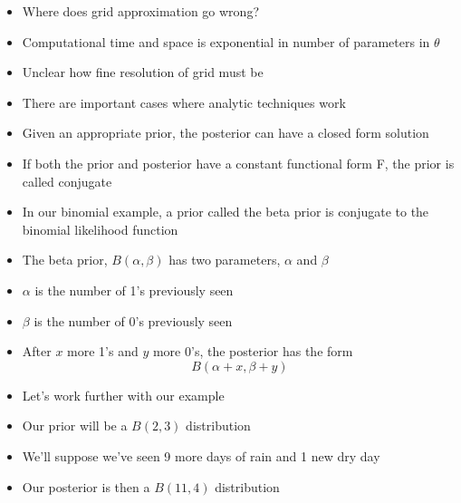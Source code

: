 \documentclass{beamer}
\begin{document}
\frame
{
  \begin{itemize}
    \item{Where does grid approximation go wrong?}
    \item{Computational time and space is exponential in number of parameters in $\theta$}
    \item{Unclear how fine resolution of grid must be}
  \end{itemize}
}

\frame
{
  \begin{itemize}
    \item{There are important cases where analytic techniques work}
    \item{Given an appropriate prior, the posterior can have a closed form solution}
    \item{If both the prior and posterior have a constant functional form F, the prior is called conjugate}
  \end{itemize}
}

\frame
{
  \begin{itemize}
    \item{In our binomial example, a prior called the beta prior is conjugate to the binomial likelihood function}
    \item{The beta prior, $B(\alpha, \beta)$ has two parameters, $\alpha$ and $\beta$}
    \item{$\alpha$ is the number of 1's previously seen}
    \item{$\beta$ is the number of 0's previously seen}
    \item{After $x$ more 1's and $y$ more 0's, the posterior has the form}
    \[
      B(\alpha + x, \beta + y)
    \]
  \end{itemize}
}

\frame
{
  \begin{itemize}
    \item{Let's work further with our example}
    \item{Our prior will be a $B(2, 3)$ distribution}
    \item{We'll suppose we've seen 9 more days of rain and 1 new dry day}
    \item{Our posterior is then a $B(11, 4)$ distribution}
  \end{itemize}
}
\end{document}
